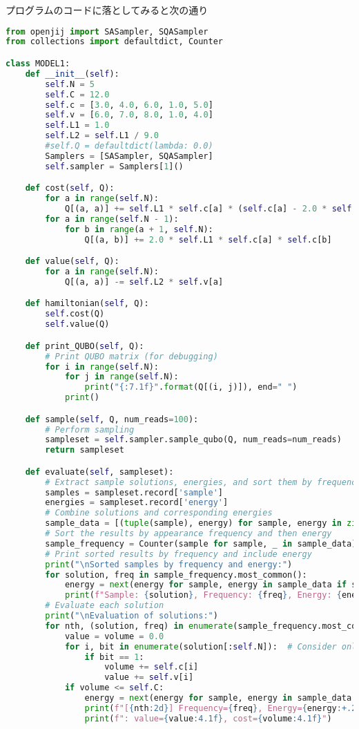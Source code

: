 \documentclass[uplatex,dvipdfmx,a4paper,11pt,oneside,openany]{jsbook}
\begin{document}
プログラムのコードに落としてみると次の通り

\begin{lstlisting}[language=Python]
from openjij import SASampler, SQASampler
from collections import defaultdict, Counter

class MODEL1:
    def __init__(self):
        self.N = 5
        self.C = 12.0
        self.c = [3.0, 4.0, 6.0, 1.0, 5.0]
        self.v = [6.0, 7.0, 8.0, 1.0, 4.0]
        self.L1 = 1.0
        self.L2 = self.L1 / 9.0
        #self.Q = defaultdict(lambda: 0.0)
        Samplers = [SASampler, SQASampler]
        self.sampler = Samplers[1]()

    def cost(self, Q):
        for a in range(self.N):
            Q[(a, a)] += self.L1 * self.c[a] * (self.c[a] - 2.0 * self.C)
        for a in range(self.N - 1):
            for b in range(a + 1, self.N):
                Q[(a, b)] += 2.0 * self.L1 * self.c[a] * self.c[b]

    def value(self, Q):
        for a in range(self.N):
            Q[(a, a)] -= self.L2 * self.v[a]

    def hamiltonian(self, Q):
        self.cost(Q)
        self.value(Q)

    def print_QUBO(self, Q):
        # Print QUBO matrix (for debugging)
        for i in range(self.N):
            for j in range(self.N):
                print("{:7.1f}".format(Q[(i, j)]), end=" ")
            print()

    def sample(self, Q, num_reads=100):
        # Perform sampling
        sampleset = self.sampler.sample_qubo(Q, num_reads=num_reads)
        return sampleset

    def evaluate(self, sampleset):
        # Extract sample solutions, energies, and sort them by frequency
        samples = sampleset.record['sample']
        energies = sampleset.record['energy']
        # Combine solutions and corresponding energies
        sample_data = [(tuple(sample), energy) for sample, energy in zip(samples, energies)]
        # Sort the results by appearance frequency and then energy
        sample_frequency = Counter(sample for sample, _ in sample_data)
        # Print sorted results by frequency and include energy
        print("\nSorted samples by frequency and energy:")
        for solution, freq in sample_frequency.most_common():
            energy = next(energy for sample, energy in sample_data if sample == solution)
            print(f"Sample: {solution}, Frequency: {freq}, Energy: {energy:+.2f}")
        # Evaluate each solution
        print("\nEvaluation of solutions:")
        for nth, (solution, freq) in enumerate(sample_frequency.most_common(), 1):
            value = volume = 0.0
            for i, bit in enumerate(solution[:self.N]):  # Consider only the first N bits for w and c
                if bit == 1:
                    volume += self.c[i]
                    value += self.v[i]
            if volume <= self.C:
                energy = next(energy for sample, energy in sample_data if sample == solution)
                print(f"[{nth:2d}] Frequency={freq}, Energy={energy:+.2f},\n Solution={solution}", end="\t")
                print(f": value={value:4.1f}, cost={volume:4.1f}")


\end{lstlisting}
\end{document}

